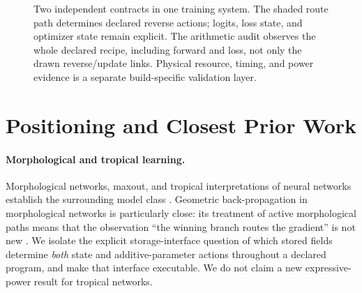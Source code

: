 \documentclass{article}
\theoremstyle{plain}
\theoremstyle{definition}
\theoremstyle{remark}
\begin{document}
\begin{figure}[t]
\centering
{}
\caption{Two independent contracts in one training system. The shaded route
path determines declared reverse actions; logits, loss state, and optimizer
state remain explicit. The arithmetic audit observes the whole declared
recipe, including forward and loss, not only the drawn reverse/update links.
Physical resource, timing, and power evidence is a separate build-specific
validation layer.}
\label{fig:contracts}
\end{figure}

\section{Positioning and Closest Prior Work}

\paragraph{Morphological and tropical learning.}
Morphological networks, maxout, and tropical interpretations of neural
networks establish the surrounding model class
\citep{ritter1996morphological,goodfellow2013maxout,zhang2018tropical,franchi2020morphological}.
Geometric back-propagation in morphological networks is particularly close:
its treatment of active morphological paths means that the observation
``the winning branch routes the gradient'' is not new
\citep{groenendijk2023geometric}. We isolate the explicit storage-interface question
of which stored fields determine \emph{both} state and additive-parameter
actions throughout a declared program, and make that interface executable.
We do not claim a new expressive-power result for tropical networks.
\end{document}
